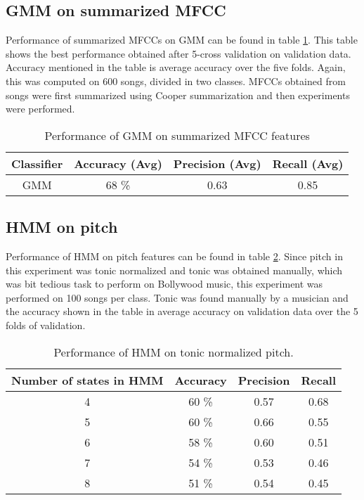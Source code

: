 \subsection{GMM on summarized MFCC} Performance of summarized MFCCs on GMM can be found in table \ref{tab:mfcc}. This table shows the best performance obtained after 5-cross validation on validation data. Accuracy mentioned in the table is average accuracy over the five folds. Again, this was computed on 600 songs, divided in two classes. MFCCs obtained from songs were first summarized using Cooper summarization and then experiments were performed. 
\begin{table}[!htbp]

\begin{center}
\begin{tabular}{ |c|c|c|c| } 
 \hline
 Classifier & Accuracy (Avg) & Precision (Avg) & Recall (Avg) \\ \hline
 GMM   & 68 \%  & 0.63 & 0.85\\ 
  \hline
\end{tabular}
\end{center}
\caption{Performance of GMM on summarized MFCC features}
\label{tab:mfcc}
\end{table}
\subsection{HMM on pitch} Performance of HMM on pitch features can be found in table \ref{tab:pitch}. Since pitch in this experiment was tonic normalized and tonic was obtained manually, which was bit tedious task to perform on Bollywood music, this experiment was performed on 100 songs per class. Tonic was found manually by a musician and the accuracy shown in the table in average accuracy on validation data over the 5 folds of validation.
\begin{table}[!htbp]
\begin{center}
\begin{tabular}{ |c|c|c|c| } 
 \hline
 Number of states in HMM & Accuracy & Precision & Recall  \\ \hline
 4 & 60 \% & 0.57 & 0.68 \\ 
 5 & 60 \% & 0.66 & 0.55 \\
 6 & 58 \% & 0.60 & 0.51 \\ 
 7 & 54 \% & 0.53 & 0.46 \\ 
 8 & 51 \% & 0.54 & 0.45\\
 
 \hline
\end{tabular}
\end{center}
\caption{Performance of HMM on tonic normalized pitch. }\label{tab:pitch}
\end{table}
